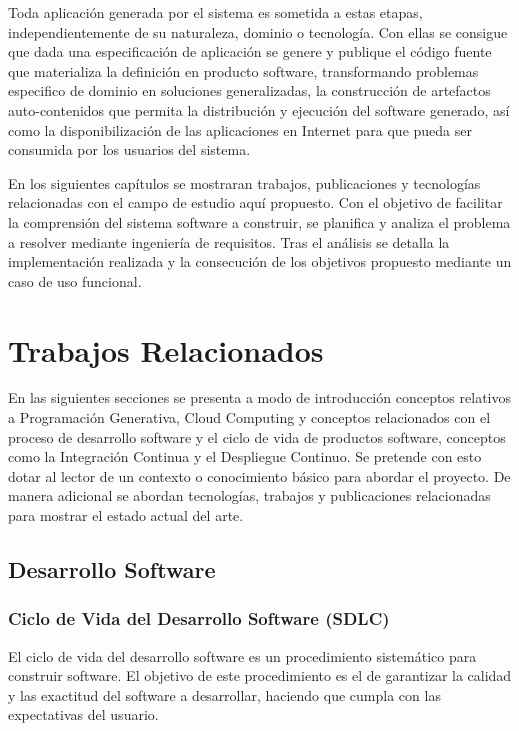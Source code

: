\documentclass[a4paper,11pt]{book}
\begin{document}
Toda aplicación generada por el sistema es sometida a estas etapas, independientemente de su naturaleza, dominio o tecnología. Con ellas se consigue que dada una especificación de aplicación se genere y publique el código fuente que materializa la definición en producto software, transformando problemas especifico de dominio en soluciones generalizadas, la construcción de artefactos auto-contenidos que permita la distribución y ejecución del software generado, así como la disponibilización de  las aplicaciones en Internet para que pueda ser consumida por los usuarios del sistema. 


En los siguientes capítulos se mostraran trabajos, publicaciones y tecnologías relacionadas con el campo de estudio aquí propuesto. Con el objetivo de facilitar la comprensión del sistema software a construir, se planifica y analiza el problema  a resolver mediante ingeniería de requisitos. Tras el análisis se detalla la implementación realizada y la consecución de los objetivos propuesto mediante un caso de uso funcional.


\chapter{Trabajos Relacionados}

En las siguientes secciones se presenta a modo de introducción conceptos relativos a Programación Generativa, Cloud Computing y conceptos relacionados con el proceso de desarrollo software y el ciclo de vida de productos software, conceptos como la Integración Continua y el Despliegue Continuo. Se pretende con esto dotar al lector de un contexto o conocimiento básico para abordar el proyecto. De manera adicional se abordan tecnologías, trabajos y publicaciones relacionadas para mostrar el estado actual del arte. 


\section{Desarrollo Software}

\subsection{Ciclo de Vida del Desarrollo Software (SDLC) }

El ciclo de vida del desarrollo software es un procedimiento sistemático para construir software.  El objetivo de este procedimiento es el de garantizar la calidad y las exactitud del software a desarrollar, haciendo que cumpla con las expectativas del usuario. 
   
\end{document}
